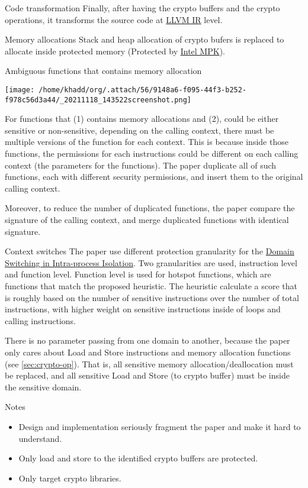 \documentclass[presentation]{beamer}
\begin{document}
\begin{frame}[label={sec:orga0fd8e6}]{Code transformation}
Finally, after having the crypto buffers and the crypto operations, it transforms the source code at \href{20211116153642-llvm_ir.org}{LLVM IR} level.

\begin{block}{Memory allocations}
Stack and heap allocation of crypto bufers is replaced to allocate inside protected memory (Protected by \href{20210909115814-intel_mpk.org}{Intel MPK}).

\begin{block}{Ambiguous functions that contains memory allocation}
\begin{center}
\texttt{[image: /home/khadd/org/.attach/56/9148a6-f095-44f3-b252-f978c56d3a44/\_20211118\_143522screenshot.png]}
\end{center}


For functions that (1) contains memory allocations and (2), could be either sensitive or non-sensitive, depending on the calling context, there must be multiple versions of the function for each context. This is because inside those functions, the permissions for each instructions could be different on each calling context (the parameters for the functions). The paper duplicate all of such functions, each with different security permissions, and insert them to the original calling context.

Moreover, to reduce the number of duplicated functions, the paper compare the signature of the calling context, and merge duplicated functions with identical signature.
\end{block}
\end{block}

\begin{block}{Context switches}
\label{sec:context-switches} The paper use different protection granularity for the \href{20211117123553-domain_switching_in_intra_process_isolation.org}{Domain Switching in Intra-process Isolation}. Two granularities are used, instruction level and function level. Function level is used for \alert{hotspot functions}, which are functions that match the proposed heuristic. The heuristic calculate a score that is roughly based on the number of sensitive instructions over the number of total instructions, with higher weight on sensitive instructions inside of loops and calling instructions.



There is no parameter passing from one domain to another, because the paper only cares about Load and Store instructions and memory allocation functions (see \ref{sec:crypto-op}). That is, all sensitive memory allocation/deallocation must be replaced, and all sensitive Load and Store (to crypto buffer) must be inside the sensitive domain.
\end{block}
\end{frame}

\begin{frame}[label={sec:org017d683}]{Notes}
\begin{itemize}
\item Design and implementation seriously fragment the paper and make it hard to understand.
\item Only load and store to the identified crypto buffers are protected.
\item Only target crypto libraries.
\end{itemize}
\end{frame}
\end{document}
